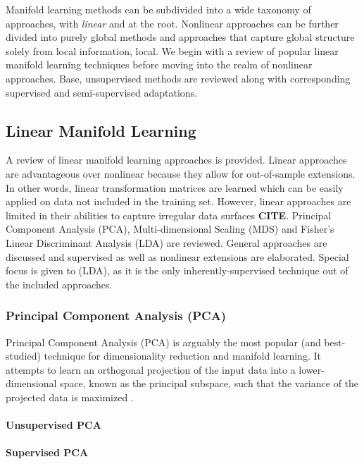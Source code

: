 Manifold learning methods can be subdivided into a wide taxonomy of approaches, with \textit{linear} and  at the root. Nonlinear approaches can be further divided into purely global methods and approaches that capture global structure solely from local information, local.  We begin with a review of popular linear manifold learning techniques before moving into the realm of nonlinear approaches. Base, unsupervised methods are reviewed along with corresponding supervised and semi-supervised adaptations. 

\subsection{Linear Manifold Learning}
A review of linear manifold learning approaches is provided.  Linear approaches are advantageous over nonlinear because they allow for out-of-sample extensions.  In other words, linear transformation matrices are learned which can be easily applied on data not included in the training set.  However, linear approaches are limited in their abilities to capture irregular data surfaces \textbf{CITE}.  Principal Component Analysis (PCA), Multi-dimensional Scaling (MDS) and Fisher's Linear Discriminant Analysis (LDA) are reviewed.  General approaches are discussed and supervised as well as nonlinear extensions are elaborated. Special focus is given to (LDA), as it is the only inherently-supervised technique out of the included approaches.

\subsubsection{Principal Component Analysis (PCA)}

Principal Component Analysis (PCA) is arguably the most popular (and best-studied) technique for dimensionality reduction and manifold learning.  It attempts to learn an orthogonal projection of the input data into a lower-dimensional space, known as the principal subspace, such that the variance of the projected data is maximized \cite{Chao2019RecentAdvancesSupervisedDimRed}.

\paragraph{Unsupervised PCA}

\paragraph{Supervised PCA}

